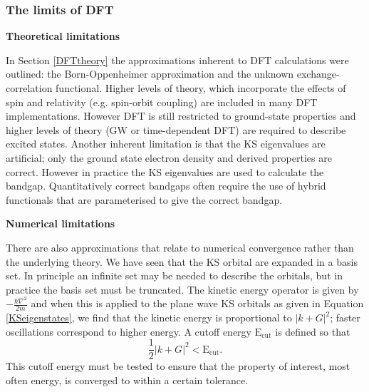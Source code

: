 \subsubsection{The limits of DFT}


\textbf{Theoretical limitations} 

In Section \ref{DFTtheory} the approximations inherent to DFT calculations were outlined: the Born-Oppenheimer approximation and the unknown exchange-correlation functional. Higher levels of theory, which incorporate the effects of spin and relativity (e.g. spin-orbit coupling) are included in many DFT implementations. However DFT is still restricted to ground-state properties and higher levels of theory (GW or time-dependent DFT) are required to describe excited states. Another inherent limitation is that the KS eigenvalues are artificial; only the ground state electron density and derived properties are correct. However in practice the KS eigenvalues are used to calculate the bandgap. Quantitatively correct bandgaps often require the use of hybrid functionals that are parameterised to give the correct bandgap.

\textbf{Numerical limitations} 

There are also approximations that relate to numerical convergence rather than the underlying theory.
We have seen that the KS orbital are expanded in a basis set. In principle an infinite set may be needed to describe the orbitals, but in practice the basis set must be truncated. The kinetic energy operator is given by $-\frac{\hbar \nabla^2}{2m}$ and when this is applied to the plane wave KS orbitals as given in Equation \ref{KSeigenstates}, we find that the kinetic energy is proportional to $|k+G|^2$; faster oscillations correspond to higher energy. A cutoff energy $\textrm{E}_\textrm{cut}$ is defined so that
\begin{equation}
\frac{1}{2}|k+G|^2 < \textrm{E}_\textrm{cut}.
\end{equation}
This cutoff energy must be tested to ensure that the property of interest, most often energy, is converged to within a certain tolerance.

